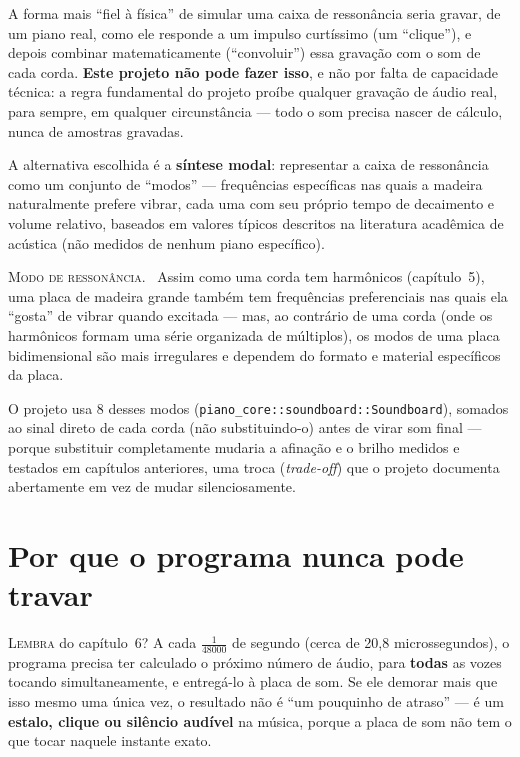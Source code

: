 \documentclass[11pt,oneside]{book}
\newcommand{\nova}[1]{\textsc{\color{accent}#1.}~}
\newcommand{\opening}[2]{\lettrine[lines=2,loversize=0.08,lraise=0.02]{#1}{#2}}
\begin{document}
A forma mais \enquote{fiel à física} de simular uma caixa de ressonância
seria gravar, de um piano real, como ele responde a um impulso curtíssimo
(um \enquote{clique}), e depois combinar matematicamente
(\enquote{convoluir}) essa gravação com o som de cada corda. \textbf{Este
projeto não pode fazer isso}, e não por falta de capacidade técnica: a
regra fundamental do projeto proíbe qualquer gravação de áudio real, para
sempre, em qualquer circunstância --- todo o som precisa nascer de
cálculo, nunca de amostras gravadas.

A alternativa escolhida é a \textbf{síntese modal}: representar a caixa de
ressonância como um conjunto de \enquote{modos} --- frequências
específicas nas quais a madeira naturalmente prefere vibrar, cada uma com
seu próprio tempo de decaimento e volume relativo, baseados em valores
típicos descritos na literatura acadêmica de acústica (não medidos de
nenhum piano específico).

\begin{newword}
\nova{Modo de ressonância} Assim como uma corda tem harmônicos
(capítulo~5), uma placa de madeira grande também tem frequências
preferenciais nas quais ela \enquote{gosta} de vibrar quando excitada ---
mas, ao contrário de uma corda (onde os harmônicos formam uma série
organizada de múltiplos), os modos de uma placa bidimensional são mais
irregulares e dependem do formato e material específicos da placa.
\end{newword}

O projeto usa 8 desses modos (\texttt{piano\_core::soundboard::Soundboard}),
somados ao sinal direto de cada corda (não substituindo-o) antes de virar
som final --- porque substituir completamente mudaria a afinação e o
brilho medidos e testados em capítulos anteriores, uma troca
(\emph{trade-off}) que o projeto documenta abertamente em vez de mudar
silenciosamente.

\chapter{Por que o programa nunca pode travar}

\opening{L}{embra} do capítulo~6? A cada $\frac{1}{48000}$ de segundo
(cerca de 20,8 microssegundos), o programa precisa ter calculado o próximo
número de áudio, para \textbf{todas} as vozes tocando simultaneamente, e
entregá-lo à placa de som. Se ele demorar mais que isso mesmo uma única
vez, o resultado não é \enquote{um pouquinho de atraso} --- é um
\textbf{estalo, clique ou silêncio audível} na música, porque a placa de
som não tem o que tocar naquele instante exato.
\end{document}
